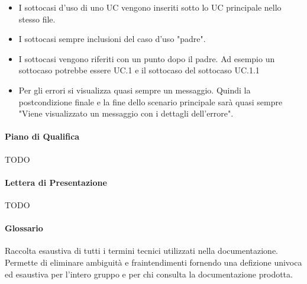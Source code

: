 \begin{itemize}
  \item I sottocasi d'uso di uno UC vengono inseriti sotto lo UC principale nello stesso file.
  \item I sottocasi sempre inclusioni del caso d'uso "padre".
  \item I sottocasi vengono riferiti con un punto dopo il padre. Ad esempio un sottocaso potrebbe essere UC.1 e il sottocaso del sottocaso UC.1.1
  \item Per gli errori si visualizza quasi sempre un messaggio. Quindi la postcondizione finale e la fine dello scenario principale sarà quasi sempre "Viene visualizzato un messaggio con i dettagli dell'errore".
\end{itemize}

\paragraph{Piano di Qualifica}
TODO

\paragraph{Lettera di Presentazione}
TODO

\paragraph{Glossario}
Raccolta esaustiva di tutti i termini tecnici utilizzati nella documentazione. Permette di eliminare ambiguità e fraintendimenti fornendo una defizione univoca ed esaustiva per l'intero gruppo e per chi consulta la documentazione prodotta.

